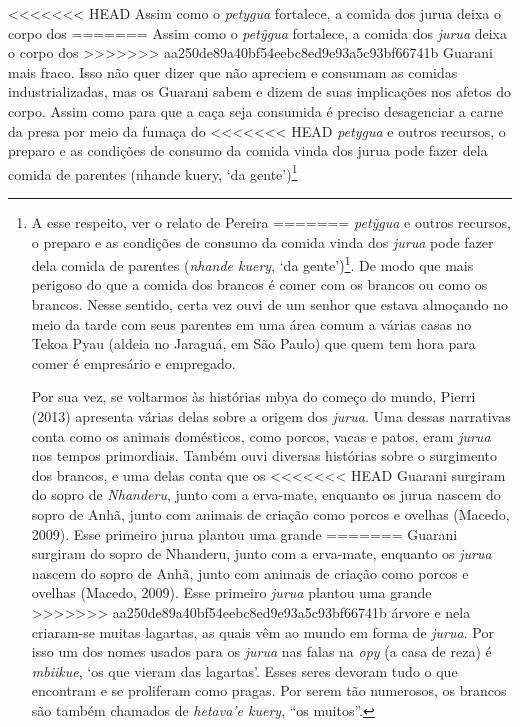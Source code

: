 {<<<<<<< HEAD
Assim como o \emph{petygua} fortalece, a comida dos jurua deixa o corpo dos
=======
Assim como o \emph{pet\~{y}gua} fortalece, a comida dos \emph{jurua} deixa o corpo dos
>>>>>>> aa250de89a40bf54eebc8ed9e93a5c93bf66741b
Guarani mais fraco. Isso não quer dizer que não apreciem e consumam as
comidas industrializadas, mas os Guarani sabem e dizem de suas
implicações nos afetos do corpo. Assim como para que a caça seja
consumida é preciso desagenciar a carne da presa por meio da fumaça do
<<<<<<< HEAD
\emph{petygua} e outros recursos, o preparo e as condições de consumo da
comida vinda dos jurua pode fazer dela comida de parentes (nhande
kuery, ‘da gente’)\footnote{A esse respeito, ver o relato de Pereira
=======
\emph{pet\~{y}gua} e outros recursos, o preparo e as condições de consumo da
comida vinda dos \emph{jurua} pode fazer dela comida de parentes (\emph{nhande
kuery}, `da gente')\footnote{A esse respeito, ver o relato de Pereira
>>>>>>> aa250de89a40bf54eebc8ed9e93a5c93bf66741b
(2014: 47ss). Para um aprofundamento do debate sobre comensalidade,
alteridade e parentesco na etnologia contemporânea, ver autores
mencionados na nota 3.}. De modo que mais perigoso do que a comida dos
brancos é comer com os brancos ou como os brancos. Nesse sentido, certa
vez ouvi de um senhor que estava almoçando no meio da tarde com seus
parentes em uma área comum a várias casas no Tekoa Pyau (aldeia no
Jaraguá, em São Paulo) que quem tem hora para comer é empresário e
empregado.

Por sua vez, se voltarmos às histórias mbya do começo do mundo, Pierri
(2013) apresenta várias delas sobre a origem dos \emph{jurua}. Uma dessas
narrativas conta como os animais domésticos, como porcos, vacas e
patos, eram \emph{jurua} nos tempos primordiais. Também ouvi diversas
histórias sobre o surgimento dos brancos, e uma delas conta que os
<<<<<<< HEAD
Guarani surgiram do sopro de \emph{Nhanderu}, junto com a erva-mate, enquanto
os jurua nascem do sopro de Anhã, junto com animais de criação como
porcos e ovelhas (Macedo, 2009). Esse primeiro jurua plantou uma grande
=======
Guarani surgiram do sopro de Nhanderu, junto com a erva-mate, enquanto
os \emph{jurua} nascem do sopro de Anhã, junto com animais de criação como
porcos e ovelhas (Macedo, 2009). Esse primeiro \emph{jurua} plantou uma grande
>>>>>>> aa250de89a40bf54eebc8ed9e93a5c93bf66741b
árvore e nela criaram-se muitas lagartas, as quais vêm ao mundo em
forma de \emph{jurua}. Por isso um dos nomes usados para os \emph{jurua} nas falas na
\emph{opy} (a casa de reza) é \emph{mbiikue}, ‘os que vieram das lagartas’. Esses
seres devoram tudo o que encontram e se proliferam como pragas. Por
serem tão numerosos, os brancos são também chamados de \emph{hetava’e kuery},
``os muitos''.

}}
